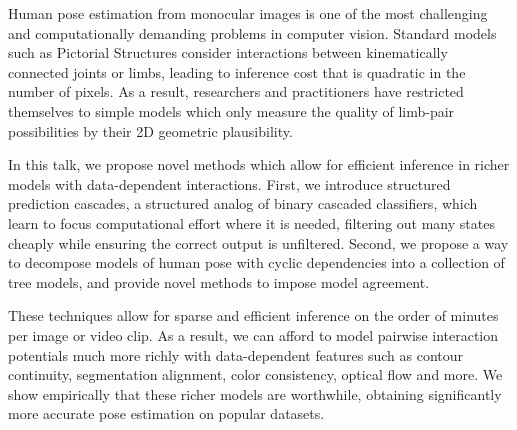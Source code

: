 Human pose estimation from monocular images is one of the most challenging and 
computationally demanding problems in computer vision. Standard models such as 
Pictorial Structures consider interactions between kinematically connected 
joints or limbs, leading to inference cost that is quadratic in the number of 
pixels. As a result, researchers and practitioners have restricted themselves 
to simple models which only measure the quality of limb-pair possibilities by 
their 2D geometric plausibility.

In this talk, we propose novel methods which allow for efficient inference in 
richer models with data-dependent interactions. First, we introduce structured 
prediction cascades, a structured analog of binary cascaded classifiers, which 
learn to focus computational effort where it is needed, filtering out many 
states cheaply while ensuring the correct output is unfiltered. Second, we 
propose a way to decompose models of human pose with cyclic dependencies into a 
collection of tree models, and provide novel methods to impose model agreement.

These techniques allow for sparse and efficient inference on the order of 
minutes per image or video clip. As a result, we can afford to model pairwise 
interaction potentials much more richly with data-dependent features such as 
contour continuity, segmentation alignment, color consistency, optical flow and 
more. We show empirically that these richer models are worthwhile, obtaining 
significantly more accurate pose estimation on popular datasets.


